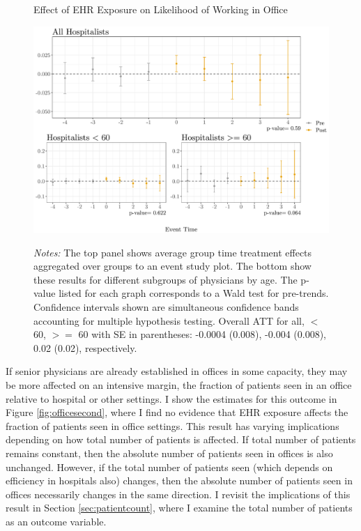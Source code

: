 \documentclass[11pt]{article}
\begin{document}
\begin{figure}[ht]
    \centering
    \captionsetup{width=.85\linewidth}
    \caption{Effect of EHR Exposure on Likelihood of Working in Office}
    \includegraphics[scale=.65]{Objects/officeind_plot.pdf}
    \label{fig:officefirst}
    \vspace{2mm}
    \caption*{\footnotesize{\textit{Notes:} The top panel shows average group time treatment effects aggregated over groups to an event study plot. The bottom show these results for different subgroups of physicians by age. The p-value listed for each graph corresponds to a Wald test for pre-trends. Confidence intervals shown are simultaneous confidence bands accounting for multiple hypothesis testing. Overall ATT for all, $<$ 60, $>=$ 60 with SE in parentheses: -0.0004 (0.008), -0.004 (0.008), 0.02 (0.02), respectively.}}
\end{figure}

If senior physicians are already established in offices in some capacity, they may be more affected on an intensive margin, the fraction of patients seen in an office relative to hospital or other settings. I show the estimates for this outcome in Figure \ref{fig:officesecond}, where I find no evidence that EHR exposure affects the fraction of patients seen in office settings. This result has varying implications depending on how total number of patients is affected. If total number of patients remains constant, then the absolute number of patients seen in offices is also unchanged. However, if the total number of patients seen (which depends on efficiency in hospitals also) changes, then the absolute number of patients seen in offices necessarily changes in the same direction. I revisit the implications of this result in Section \ref{sec:patientcount}, where I examine the total number of patients as an outcome variable.
\end{document}
